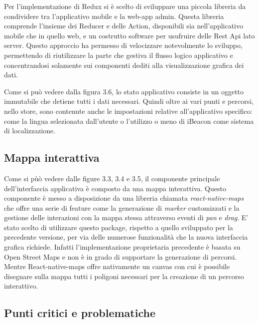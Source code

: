 Per l'implementazione di Redux si è scelto di sviluppare una piccola libreria da condividere tra l'applicativo mobile e la web-app admin. Questa libreria comprende l'insieme dei Reducer e delle Action, disponibili sia nell'applicativo mobile che in quello web, e un costrutto software per usufruire delle Rest Api lato server. Questo approccio ha permesso di velocizzare notevolmente lo sviluppo, permettendo di riutilizzare la parte che gestiva il flusso logico applicativo e concentrandosi solamente sui componenti dediti alla visualizzazione grafica dei dati.\vspace{5mm}

Come si può vedere dalla figura 3.6, lo stato applicativo consiste in un oggetto immutabile che detiene tutti i dati necessari. Quindi oltre ai vari punti e percorsi, nello store, sono contenute anche le impostazioni relative all'applicativo specifico: come la lingua selezionata dall'utente o l'utilizzo o meno di iBeacon come sistema di localizzazione.\vspace{5mm}

\subsection{Mappa interattiva}\vspace{5mm}

Come si pùò vedere dalle figure 3.3, 3.4 e 3.5, il componente principale dell'interfaccia applicativa è composto da una mappa interattiva. Questo componente è messo a disposizione da una libreria chiamata \emph{react-native-maps} che offre una serie di feature come la generazione di \emph{marker} customizzati e la gestione delle interazioni con la mappa stessa attraverso eventi di \emph{pan} e \emph{drag}. E' stato scelto di utilizzare questo package, rispetto a quello sviluppato per la precedente versione, per via delle numerose funzionalità che la nuova interfaccia grafica richiede. Infatti l'implementazione proprietaria precedente è basata su Open Street Maps e non è in grado di supportare la generazione di percorsi. Mentre React-native-maps offre nativamente un canvas con cui è possibile disegnare sulla mappa tutti i poligoni necessari per la creazione di un percorso interattivo. \vspace{5mm}

\subsection{Punti critici e problematiche}\vspace{5mm}

